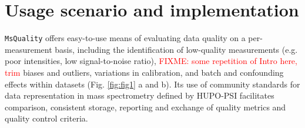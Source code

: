 \documentclass{bioinfo}
\newcommand{\fixme}[1]{\textcolor{red}{FIXME: #1}}
\begin{document}
\section{Usage scenario and implementation} \label{usagescenario}

\texttt{MsQuality} offers easy-to-use means of evaluating data quality on a
per-measurement basis, including the identification of low-quality measurements (e.g. poor
intensities, low signal-to-noise ratio), \fixme{some repetition of Intro here, trim}
biases and outliers, variations in calibration, and batch and confounding effects within
datasets (Fig. \ref{fig:fig1} a and b).  Its use of community standards for data
representation in mass spectrometry defined by HUPO-PSI facilitates comparison, consistent
storage, reporting and exchange of quality metrics and quality control criteria.
\end{document}
